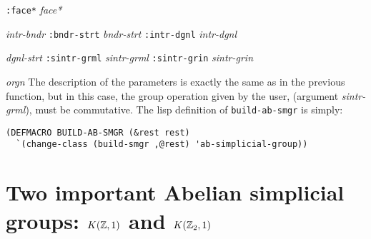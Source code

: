              {\tt :face*} {\em face*}  \par
\hspace {0.60cm}{\tt :intr-bndr} {\em intr-bndr} {\tt :bndr-strt} {\em bndr-strt} {\tt :intr-dgnl} {\em intr-dgnl} \par
\hspace {0.60cm}{\tt :dgnl-strt} {\em dgnl-strt} {\tt :sintr-grml} {\em sintr-grml} {\tt :sintr-grin} {\em sintr-grin} \par
\hspace {0.60cm}{\tt :orgn} {\em orgn}
\vskip 0.35cm
The description of the parameters is exactly the same as in the previous function, but in this case,
the group operation given by the user, (argument {\em sintr-grml}), must be commutative.
The lisp definition of {\tt build-ab-smgr} is simply:
{\footnotesize\begin{verbatim}
(DEFMACRO BUILD-AB-SMGR (&rest rest)
  `(change-class (build-smgr ,@rest) 'ab-simplicial-group))
\end{verbatim}}

\section {Two important Abelian simplicial groups: $K({\mathbb{Z}}, 1)$ and $K({\mathbb{Z}}_2, 1)$}

